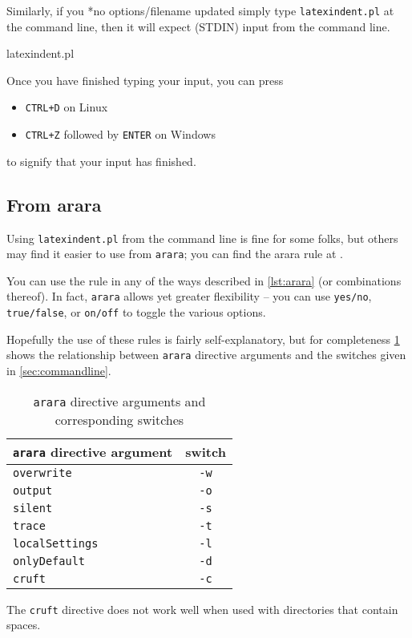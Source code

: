 	Similarly, if you%
	*{no options/filename updated} simply type \texttt{latexindent.pl}
	at the command line, then it will expect (STDIN) input from the command line.
	\begin{commandshell}
latexindent.pl
      \end{commandshell}

	Once you have finished typing your input, you can press
	\begin{itemize}
		\item \texttt{CTRL+D} on Linux
		\item \texttt{CTRL+Z} followed by \texttt{ENTER} on Windows
	\end{itemize}
	to signify that your input has finished.

\subsection{From arara}\label{sec:arara}
	Using \texttt{latexindent.pl} from the command line is fine for some folks, but
	others may find it easier to use from \texttt{arara}; you can find the arara rule at \cite{paulo}.

	You can use the rule in any of the ways described in \cref{lst:arara} (or combinations thereof).
	In fact, \texttt{arara} allows yet greater flexibility -- you can use \texttt{yes/no}, \texttt{true/false}, or \texttt{on/off} to toggle the various options.


	Hopefully the use of these rules is fairly self-explanatory, but for completeness
	\cref{tab:orbsandswitches} shows the relationship between \texttt{arara} directive arguments and the
	switches given in \cref{sec:commandline}.

	\begin{table}[!ht]
		\centering
		\caption{\texttt{arara} directive arguments and corresponding switches}
		\label{tab:orbsandswitches}
		\begin{tabular}{lc}
			\toprule
			\texttt{arara} directive argument & switch      \\
			\midrule
			\texttt{overwrite}                & \texttt{-w} \\
			\texttt{output}                   & \texttt{-o} \\
			\texttt{silent}                   & \texttt{-s} \\
			\texttt{trace}                    & \texttt{-t} \\
			\texttt{localSettings}            & \texttt{-l} \\
			\texttt{onlyDefault}              & \texttt{-d} \\
			\texttt{cruft}                    & \texttt{-c} \\
			\bottomrule
		\end{tabular}
	\end{table}

	The \texttt{cruft} directive does not work well when used with
	directories that contain spaces.

